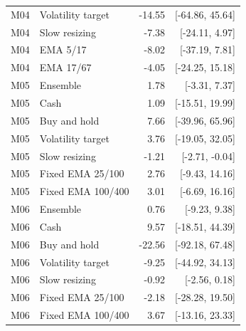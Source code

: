 \begin{longtable}{llrr}
M04 & Volatility target & -14.55 & [-64.86, 45.64]\\
M04 & Slow resizing & -7.38 & [-24.11, 4.97]\\
M04 & EMA 5/17 & -8.02 & [-37.19, 7.81]\\
M04 & EMA 17/67 & -4.05 & [-24.25, 15.18]\\
M05 & Ensemble & 1.78 & [-3.31, 7.37]\\
M05 & Cash & 1.09 & [-15.51, 19.99]\\
M05 & Buy and hold & 7.66 & [-39.96, 65.96]\\
M05 & Volatility target & 3.76 & [-19.05, 32.05]\\
M05 & Slow resizing & -1.21 & [-2.71, -0.04]\\
M05 & Fixed EMA 25/100 & 2.76 & [-9.43, 14.16]\\
M05 & Fixed EMA 100/400 & 3.01 & [-6.69, 16.16]\\
M06 & Ensemble & 0.76 & [-9.23, 9.38]\\
M06 & Cash & 9.57 & [-18.51, 44.39]\\
M06 & Buy and hold & -22.56 & [-92.18, 67.48]\\
M06 & Volatility target & -9.25 & [-44.92, 34.13]\\
M06 & Slow resizing & -0.92 & [-2.56, 0.18]\\
M06 & Fixed EMA 25/100 & -2.18 & [-28.28, 19.50]\\
M06 & Fixed EMA 100/400 & 3.67 & [-13.16, 23.33]\\
\bottomrule\end{longtable}\endgroup
